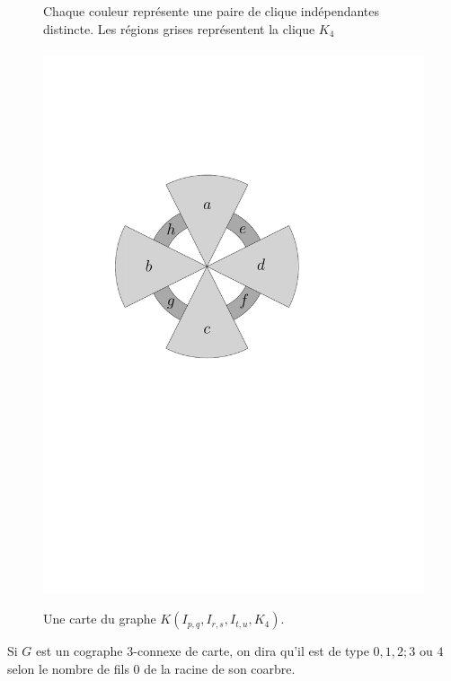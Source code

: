 \documentclass{scrartcl}
\begin{document}
\begin{flushleft}
\begin{figure}[h]
    \caption{Une carte du graphe $K(I_{p,q}, I_{r,s}, I_{t,u}, K_4)$.}\label{IpqIrsItuMap}
    \begin{center}
        Chaque couleur représente une paire de clique indépendantes distincte. Les régions grises représentent la clique $K_4$
        \\~\\
        \includegraphics[page=\ipeFigIpqIrsItuMap, scale = 0.6]{figs}
    \end{center}
\end{figure}

\begin{def*}[Type]
    Si $G$ est un cographe $3$-connexe de carte, on dira qu'il est de type $0,1,2;3$ ou $4$ selon le nombre de fils $0$ de
    la racine de son coarbre.
\end{def*}


\end{flushleft}
\end{document}
